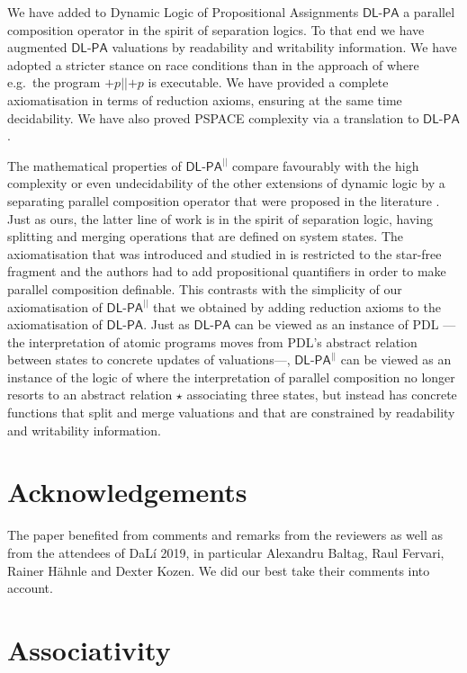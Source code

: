 \documentclass{llncs}
\newcommand{\pll}{ {||} }							%
\newcommand{\Dlpa}{\ensuremath{\mathsf{DL\text{-}PA}}\xspace}
\newcommand{\DlpaPll}{\ensuremath{\mathsf{DL\text{-}PA}^\pll}\xspace}
\newcommand{\assgntop}[1]{{\mathtt {+} #1}}
\begin{document}
We have added to Dynamic Logic of Propositional Assignments \Dlpa
a parallel composition operator in the spirit of separation logics. 
To that end we have augmented \Dlpa valuations by readability and writability information. 
We have adopted a stricter stance on race conditions than in the approach of \cite{HerzigEtal-Ijcai19} 
where e.g.\ the program $\assgntop p \pll \assgntop p$ is executable.
We have provided a complete axiomatisation in terms of reduction axioms, 
ensuring at the same time decidability. 
We have also proved PSPACE complexity via a translation to \Dlpa. 

The mathematical properties of \DlpaPll compare favourably with 
the high complexity or even undecidability of the 
other extensions of dynamic logic by a separating parallel composition operator that were proposed in the literature
\cite{BalbianiT14,Boudou16}.
Just as ours, the latter line of work is in the spirit of separation logic, having splitting and merging operations that are defined on system states. 
The axiomatisation that was introduced and studied in \cite{DBLP:journals/logcom/BalbianiB18} is restricted to the star-free fragment and the authors had to add propositional quantifiers in order to make parallel composition definable. 
This contrasts with the simplicity of our axiomatisation of \DlpaPll that we obtained by adding reduction axioms to the axiomatisation of \Dlpa. 
Just as \Dlpa can be viewed as an instance of PDL%
---the interpretation of atomic programs moves from PDL's abstract relation between states to concrete updates of valuations\mbox{---,}
\DlpaPll can be viewed as an instance of the logic of \cite{DBLP:journals/entcs/BenevidesFV11}
where the interpretation of parallel composition no longer resorts to
an abstract relation $\star$ associating three states, 
but instead has concrete functions that split and merge valuations and that are constrained by readability and writability information. 

\section{Acknowledgements}
The paper benefited from comments and remarks from the reviewers as well as from the attendees of DaL\'i 2019, 
in particular Alexandru Baltag, Raul Fervari, Rainer H\"ahnle and Dexter Kozen. 
We did our best take their comments into account. 


\appendix
\section{Associativity}


%


\end{document}
